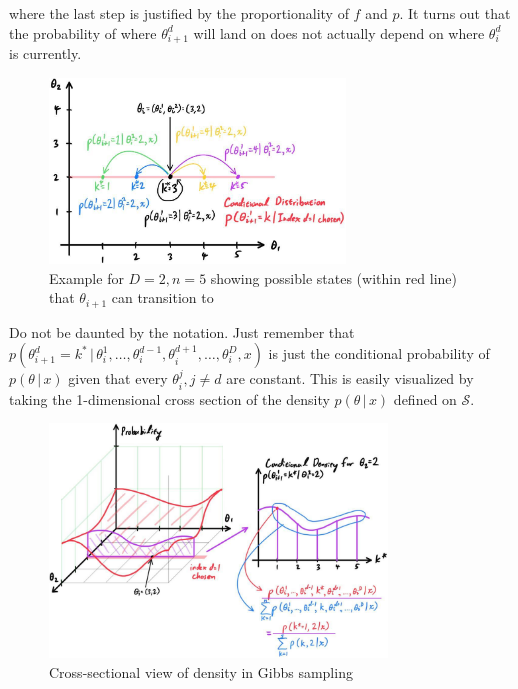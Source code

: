 \begin{enumerate}
    where the last step is justified by the proportionality of $f$ and $p$. It turns out that the probability of where $\theta_{i+1}^d$ will land on does not actually depend on where $\theta_{i}^d$ is currently.
  \end{enumerate}

  \begin{figure}[H]
    \centering
    \includegraphics[width=0.7\textwidth]{img/example_gibbs_1.jpg}
    \caption{Example for $D=2, n=5$ showing possible states (within red line) that $\theta_{i+1}$ can transition to}
  \end{figure}

  Do not be daunted by the notation. Just remember that $p(\theta_{i+1}^d = k^* \,|\,\theta_i^1, \ldots, \theta_i^{d-1}, \theta_i^{d+1}, \ldots, \theta_i^D, x)$ is just the conditional probability of $p(\theta\,|\,x)$ given that every $\theta_i^j, j \neq d$ are constant. This is easily visualized by taking the 1-dimensional cross section of the density $p(\theta\,|\,x)$ defined on $\mathcal{S}$.

  \begin{figure}[H]
    \centering
    \includegraphics[width=0.8\textwidth]{img/Gibbs_step_2.jpg}
    \caption{Cross-sectional view of density in Gibbs sampling}
  \end{figure}

